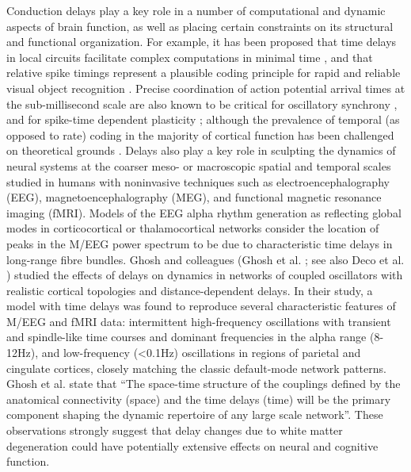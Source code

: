 Conduction delays play a key role in a number of computational and dynamic aspects of brain function, as well as placing certain constraints on its structural and functional organization. For example, it has been proposed that time delays in local circuits facilitate complex computations in minimal time \cite{izhikevich2006polychronization}, and that relative spike timings represent a plausible coding principle for rapid and reliable visual object recognition \cite{vanrullen2002surfing}. Precise coordination of action potential arrival times at the sub-millisecond scale are also known to be critical for oscillatory synchrony \cite{fries2005a}, and for spike-time dependent plasticity 
; although the prevalence of temporal (as opposed to rate) coding in the majority of cortical function has been challenged on theoretical grounds \cite{shadlen1998the}. Delays also play a key role in sculpting the dynamics of neural systems at the coarser meso- or macroscopic spatial and temporal scales studied in humans with noninvasive techniques such as electroencephalography (EEG), magnetoencephalography (MEG), and functional magnetic resonance imaging (fMRI). Models of the EEG alpha rhythm generation as reflecting global modes in corticocortical   or thalamocortical \cite{robinson2003neurophysical} networks consider the location of peaks in the M/EEG power spectrum to be due to characteristic time delays in long-range fibre bundles. Ghosh and colleagues (Ghosh et al. ; see also Deco et al. ) studied the effects of delays on dynamics in networks of coupled oscillators with realistic cortical topologies and distance-dependent delays. In their study, a model with time delays was found to reproduce several characteristic features of M/EEG and fMRI data: intermittent high-frequency oscillations with transient and spindle-like time courses and dominant frequencies in the alpha range (8-12Hz), and low-frequency (<0.1Hz) oscillations in regions of parietal and cingulate cortices, closely matching the classic default-mode network patterns.  Ghosh et al. state that “The space-time structure of the couplings defined by the anatomical connectivity (space) and the time delays (time) will be the primary component shaping
the dynamic repertoire of any large scale network”. These observations strongly suggest that delay changes due to white matter degeneration could have potentially extensive effects on neural and cognitive function. 

